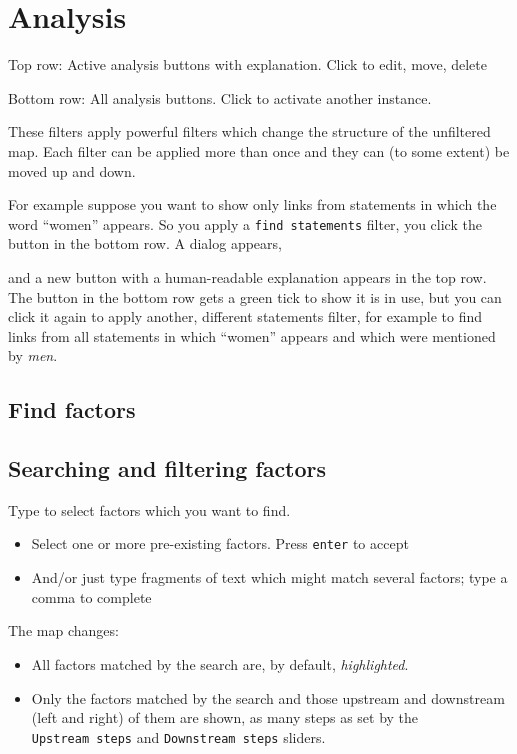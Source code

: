 \documentclass[
]{book}
\providecommand{\tightlist}{%
  \setlength{\itemsep}{0pt}\setlength{\parskip}{0pt}}
\begin{document}
\hypertarget{analysis}{%
\section{Analysis}\label{analysis}}

Top row: Active analysis buttons with explanation. Click to edit, move, delete

Bottom row: All analysis buttons. Click to activate another instance.

These filters apply powerful filters which change the structure of the unfiltered map. Each filter can be applied more than once and they can (to some extent) be moved up and down.

For example suppose you want to show only links from statements in which the word ``women'' appears. So you apply a \texttt{find\ statements} filter, you click the button in the bottom row. A dialog appears,

and a new button with a human-readable explanation appears in the top row. The button in the bottom row gets a green tick to show it is in use, but you can click it again to apply another, different statements filter, for example to find links from all statements in which ``women'' appears and which were mentioned by \emph{men}.

\hypertarget{find-factors}{%
\subsection{Find factors}\label{find-factors}}

\hypertarget{searching-and-filtering-factors}{%
\subsection{Searching and filtering factors}\label{searching-and-filtering-factors}}

Type to select factors which you want to find.

\begin{itemize}
\tightlist
\item
  Select one or more pre-existing factors. Press \texttt{enter} to accept
\item
  And/or just type fragments of text which might match several factors; type a comma to complete
\end{itemize}

The map changes:

\begin{itemize}
\tightlist
\item
  All factors matched by the search are, by default, \emph{highlighted}.
\item
  Only the factors matched by the search and those upstream and downstream (left and right) of them are shown, as many steps as set by the \texttt{Upstream\ steps} and \texttt{Downstream\ steps} sliders.
\end{itemize}
\end{document}
